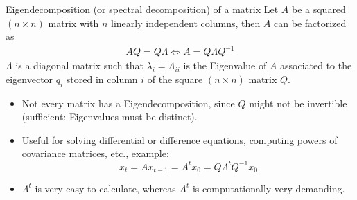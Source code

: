 \documentclass[handout]{beamer}  %
\begin{document}
\begin{frame}
\frametitle{\secname}\framesubtitle{}
\begin{block}{Eigendecomposition (or spectral decomposition) of a matrix}
  Let $A$ be a squared $(n\times n)$ matrix with $n$ linearly independent columns, then $A$ can be factorized as
  \begin{align*}
  AQ = Q \Lambda \Leftrightarrow A = Q \Lambda Q^{-1}
  \end{align*}
   $\Lambda$ is a diagonal matrix such that $\lambda_i =\Lambda_{ii}$ is the Eigenvalue of $A$ associated to the eigenvector $q_i$ stored in column $i$ of the square $(n \times n)$ matrix $Q$.
\end{block}
\begin{itemize}
  \item Not every matrix has a Eigendecomposition, since $Q$ might not be invertible (sufficient: Eigenvalues must be distinct).
  \item Useful for solving differential or difference equations, computing powers of covariance matrices, etc., example: $$x_{t} = A x_{t-1} = A^t x_{0}=Q\Lambda^t Q^{-1} x_{0}$$
  \item $\Lambda^t$ is very easy to calculate, whereas $A^t$ is computationally very demanding.
\end{itemize}
\end{frame}
\end{document}
